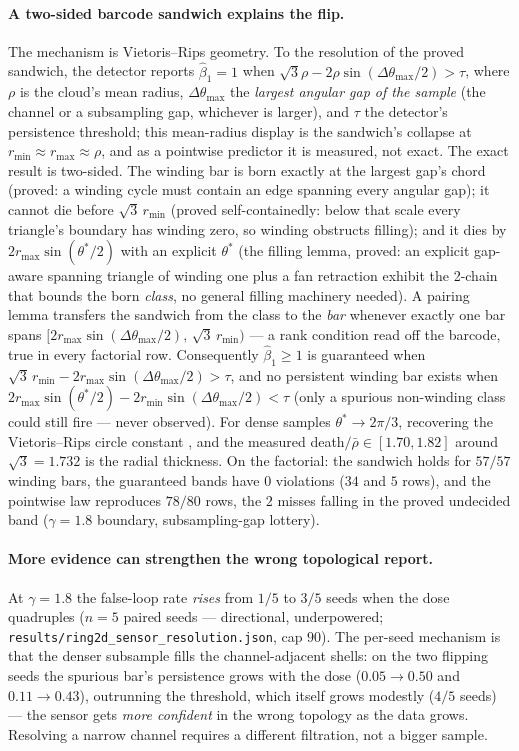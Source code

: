 \documentclass[11pt]{article}
\theoremstyle{remark}
\begin{document}
\paragraph{A two-sided barcode sandwich explains the flip.} The
mechanism is Vietoris--Rips geometry. To the resolution of the proved
sandwich, the detector reports $\hat\beta_1 = 1$ when
$\sqrt{3}\rho - 2\rho \sin(\Delta\theta_{\max}/2) > \tau$, where $\rho$
is the cloud's mean radius, $\Delta\theta_{\max}$ the \emph{largest
angular gap of the sample} (the channel or a subsampling gap, whichever
is larger), and $\tau$ the detector's persistence threshold; this
mean-radius display is the sandwich's collapse at
$r_{\min} \approx r_{\max} \approx \rho$, and as a pointwise predictor
it is measured, not exact. The exact result is two-sided. The winding
bar is born exactly at the largest gap's chord (proved: a winding cycle
must contain an edge spanning every angular gap); it cannot die before
$\sqrt{3}\, r_{\min}$ (proved self-containedly: below that scale every
triangle's boundary has winding zero, so winding obstructs filling); and
it dies by $2 r_{\max} \sin(\theta^*/2)$ with an explicit $\theta^*$
(the filling lemma, proved: an explicit gap-aware spanning triangle of
winding one plus a fan retraction exhibit the 2-chain that bounds the
born \emph{class}, no general filling machinery needed). A pairing lemma
transfers the sandwich from the class to the \emph{bar} whenever exactly
one bar spans
$[2 r_{\max}\sin(\Delta\theta_{\max}/2),\, \sqrt3\,r_{\min})$ --- a rank
condition read off the barcode, true in every factorial row.
Consequently $\hat\beta_1 \ge 1$ is
guaranteed when $\sqrt3\,r_{\min} - 2 r_{\max}\sin(\Delta\theta_{\max}/2)
> \tau$, and no persistent winding bar exists when
$2 r_{\max}\sin(\theta^*/2) - 2 r_{\min}\sin(\Delta\theta_{\max}/2) <
\tau$ (only a spurious non-winding class could still fire --- never
observed). For dense samples $\theta^* \to 2\pi/3$, recovering the
Vietoris--Rips circle constant \citep{adamaszek2017vietoris}, and the
measured death$/\bar\rho \in [1.70, 1.82]$ around $\sqrt 3 = 1.732$ is
the radial thickness. On the factorial: the sandwich holds for $57/57$
winding bars,
the guaranteed bands have $0$ violations ($34$ and $5$ rows), and the
pointwise law reproduces $78/80$ rows, the $2$ misses falling in the
proved undecided band ($\gamma = 1.8$ boundary, subsampling-gap
lottery).

\paragraph{More evidence can strengthen the wrong topological report.}
At $\gamma = 1.8$ the false-loop rate \emph{rises} from $1/5$
to $3/5$ seeds when the dose quadruples ($n = 5$ paired seeds ---
directional, underpowered;
\texttt{results/ring2d\_sensor\_resolution.json}, cap $90$). The per-seed
mechanism is that the denser subsample fills the channel-adjacent shells:
on the two flipping seeds the spurious bar's persistence grows with the
dose ($0.05 \to 0.50$ and $0.11 \to 0.43$), outrunning the threshold,
which itself grows modestly ($4/5$ seeds) --- the sensor gets
\emph{more confident} in the wrong topology as the data grows. Resolving a
narrow channel requires a different filtration, not a bigger sample.
\end{document}
